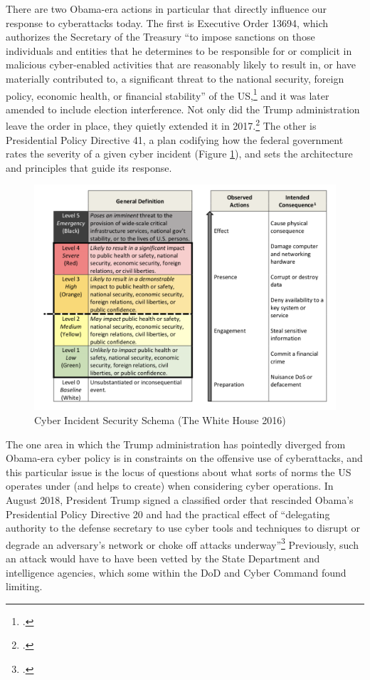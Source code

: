 \documentclass{report}
\begin{document}
\begin{refsegment}
There are two Obama-era actions in particular that directly influence our response to cyberattacks today. The first is Executive Order 13694, which authorizes the Secretary of the Treasury ``to impose sanctions on those individuals and entities that he determines to be responsible for or complicit in malicious cyber-enabled activities that are reasonably likely to result in, or have materially contributed to, a significant threat to the national security, foreign policy, economic health, or financial stability'' of the US,\footcite{daniel_our_2015} and it was later amended to include election interference. Not only did the Trump administration leave the order in place, they quietly extended it in 2017.\footcite{uchill_white_2017} The other is Presidential Policy Directive 41, a plan codifying how the federal government rates the severity of a given cyber incident (Figure \ref{severity-schema}), and sets the architecture and principles that guide its response.

\begin{figure}
\centering
\includegraphics[scale=0.53]{severity-schema.png}
\caption{Cyber Incident Security Schema (The White House 2016)}
\label{severity-schema}
\end{figure}

The one area in which the Trump administration has pointedly diverged from Obama-era cyber policy is in constraints on the offensive use of cyberattacks, and this particular issue is the locus of questions about what sorts of norms the US operates under (and helps to create) when considering cyber operations. In August 2018, President Trump signed a classified order that rescinded Obama's Presidential Policy Directive 20 and had the practical effect of ``delegating authority to the defense secretary to use cyber tools and techniques to disrupt or degrade an adversary's network or choke off attacks underway''\footcite{nakashima_trump_2018} Previously, such an attack would have to have been vetted by the State Department and intelligence agencies, which some within the DoD and Cyber Command found limiting.


\end{refsegment}
\end{document}
